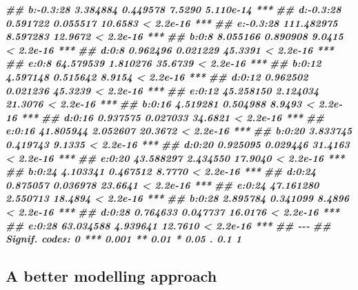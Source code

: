 \documentclass[
]{book}
\newenvironment{Shaded}{\begin{snugshade}}{\end{snugshade}}
\newcommand{\DocumentationTok}[1]{\textcolor[rgb]{0.56,0.35,0.01}{\textbf{\textit{#1}}}}
\begin{document}
\begin{Shaded}
\begin{Highlighting}[]
\DocumentationTok{\#\# b:{-}0.3:28   3.384884   0.449578  7.5290 5.110e{-}14 ***}
\DocumentationTok{\#\# d:{-}0.3:28   0.591722   0.055517 10.6583 \textless{} 2.2e{-}16 ***}
\DocumentationTok{\#\# e:{-}0.3:28 111.482975   8.597283 12.9672 \textless{} 2.2e{-}16 ***}
\DocumentationTok{\#\# b:0:8       8.055166   0.890908  9.0415 \textless{} 2.2e{-}16 ***}
\DocumentationTok{\#\# d:0:8       0.962496   0.021229 45.3391 \textless{} 2.2e{-}16 ***}
\DocumentationTok{\#\# e:0:8      64.579539   1.810276 35.6739 \textless{} 2.2e{-}16 ***}
\DocumentationTok{\#\# b:0:12      4.597148   0.515642  8.9154 \textless{} 2.2e{-}16 ***}
\DocumentationTok{\#\# d:0:12      0.962502   0.021236 45.3239 \textless{} 2.2e{-}16 ***}
\DocumentationTok{\#\# e:0:12     45.258150   2.124034 21.3076 \textless{} 2.2e{-}16 ***}
\DocumentationTok{\#\# b:0:16      4.519281   0.504988  8.9493 \textless{} 2.2e{-}16 ***}
\DocumentationTok{\#\# d:0:16      0.937575   0.027033 34.6821 \textless{} 2.2e{-}16 ***}
\DocumentationTok{\#\# e:0:16     41.805944   2.052607 20.3672 \textless{} 2.2e{-}16 ***}
\DocumentationTok{\#\# b:0:20      3.833745   0.419743  9.1335 \textless{} 2.2e{-}16 ***}
\DocumentationTok{\#\# d:0:20      0.925095   0.029446 31.4163 \textless{} 2.2e{-}16 ***}
\DocumentationTok{\#\# e:0:20     43.588297   2.434550 17.9040 \textless{} 2.2e{-}16 ***}
\DocumentationTok{\#\# b:0:24      4.103341   0.467512  8.7770 \textless{} 2.2e{-}16 ***}
\DocumentationTok{\#\# d:0:24      0.875057   0.036978 23.6641 \textless{} 2.2e{-}16 ***}
\DocumentationTok{\#\# e:0:24     47.161280   2.550713 18.4894 \textless{} 2.2e{-}16 ***}
\DocumentationTok{\#\# b:0:28      2.895784   0.341099  8.4896 \textless{} 2.2e{-}16 ***}
\DocumentationTok{\#\# d:0:28      0.764633   0.047737 16.0176 \textless{} 2.2e{-}16 ***}
\DocumentationTok{\#\# e:0:28     63.034588   4.939641 12.7610 \textless{} 2.2e{-}16 ***}
\DocumentationTok{\#\# {-}{-}{-}}
\DocumentationTok{\#\# Signif. codes:  0 \textquotesingle{}***\textquotesingle{} 0.001 \textquotesingle{}**\textquotesingle{} 0.01 \textquotesingle{}*\textquotesingle{} 0.05 \textquotesingle{}.\textquotesingle{} 0.1 \textquotesingle{} \textquotesingle{} 1}
\end{Highlighting}
\end{Shaded}

\hypertarget{a-better-modelling-approach-1}{%
\subsection{A better modelling approach}\label{a-better-modelling-approach-1}}
\end{document}

